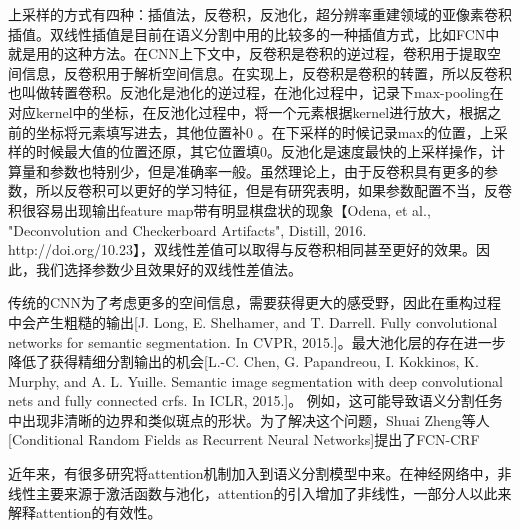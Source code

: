 \documentclass[UTF8]{ctexart}
\begin{document}
上采样的方式有四种：插值法，反卷积，反池化，超分辨率重建领域的亚像素卷积插值。双线性插值是目前在语义分割中用的比较多的一种插值方式，比如FCN中就是用的这种方法。在CNN上下文中，反卷积是卷积的逆过程，卷积用于提取空间信息，反卷积用于解析空间信息。在实现上，反卷积是卷积的转置，所以反卷积也叫做转置卷积。反池化是池化的逆过程，在池化过程中，记录下max-pooling在对应kernel中的坐标，在反池化过程中，将一个元素根据kernel进行放大，根据之前的坐标将元素填写进去，其他位置补0 。在下采样的时候记录max的位置，上采样的时候最大值的位置还原，其它位置填0。反池化是速度最快的上采样操作，计算量和参数也特别少，但是准确率一般。虽然理论上，由于反卷积具有更多的参数，所以反卷积可以更好的学习特征，但是有研究表明，如果参数配置不当，反卷积很容易出现输出feature map带有明显棋盘状的现象【Odena, et al., "Deconvolution and Checkerboard Artifacts", Distill, 2016. http://doi.org/10.23】，双线性差值可以取得与反卷积相同甚至更好的效果。因此，我们选择参数少且效果好的双线性差值法。

传统的CNN为了考虑更多的空间信息，需要获得更大的感受野，因此在重构过程中会产生粗糙的输出[J. Long, E. Shelhamer, and T. Darrell. Fully convolutional networks for semantic segmentation. In CVPR, 2015.]。最大池化层的存在进一步降低了获得精细分割输出的机会[L.-C. Chen, G. Papandreou, I. Kokkinos, K. Murphy, and A. L. Yuille. Semantic image segmentation with deep convolutional nets and fully connected crfs. In ICLR, 2015.]。
例如，这可能导致语义分割任务中出现非清晰的边界和类似斑点的形状。为了解决这个问题，Shuai Zheng等人[Conditional Random Fields as Recurrent Neural Networks]提出了FCN-CRF

近年来，有很多研究将attention机制加入到语义分割模型中来。在神经网络中，非线性主要来源于激活函数与池化，attention的引入增加了非线性，一部分人以此来解释attention的有效性。



\end{document}
